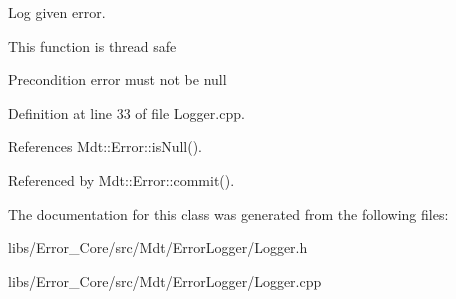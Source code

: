 Log given error. 

This function is thread safe \begin{DoxyPrecond}{Precondition}
error must not be null 
\end{DoxyPrecond}


Definition at line 33 of file Logger.\+cpp.



References Mdt\+::\+Error\+::is\+Null().



Referenced by Mdt\+::\+Error\+::commit().



The documentation for this class was generated from the following files\+:\begin{DoxyCompactItemize}
\item 
libs/\+Error\+\_\+\+Core/src/\+Mdt/\+Error\+Logger/Logger.\+h\item 
libs/\+Error\+\_\+\+Core/src/\+Mdt/\+Error\+Logger/Logger.\+cpp\end{DoxyCompactItemize}
